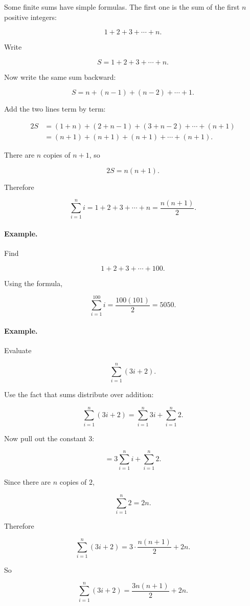 Some finite sums have simple formulas.  The first one is the sum of the first \(n\)
positive integers:

\[
1+2+3+\cdots+n.
\]

Write

\[
S=1+2+3+\cdots+n.
\]

Now write the same sum backward:

\[
S=n+(n-1)+(n-2)+\cdots+1.
\]

Add the two lines term by term:

\[
\begin{aligned}
2S
&=
(1+n)+(2+n-1)+(3+n-2)+\cdots+(n+1)\\
&=
(n+1)+(n+1)+(n+1)+\cdots+(n+1).
\end{aligned}
\]

There are \(n\) copies of \(n+1\), so

\[
2S=n(n+1).
\]

Therefore

\[
\boxed{
\sum_{i=1}^{n} i
=
1+2+3+\cdots+n
=
\frac{n(n+1)}{2}.
}
\]

\paragraph{Example.}
Find

\[
1+2+3+\cdots+100.
\]

Using the formula,

\[
\sum_{i=1}^{100} i
=
\frac{100(101)}{2}
=
5050.
\]

\paragraph{Example.}
Evaluate

\[
\sum_{i=1}^{n}(3i+2).
\]

Use the fact that sums distribute over addition:

\[
\sum_{i=1}^{n}(3i+2)
=
\sum_{i=1}^{n}3i+\sum_{i=1}^{n}2.
\]

Now pull out the constant \(3\):

\[
=
3\sum_{i=1}^{n}i+\sum_{i=1}^{n}2.
\]

Since there are \(n\) copies of \(2\),

\[
\sum_{i=1}^{n}2=2n.
\]

Therefore

\[
\sum_{i=1}^{n}(3i+2)
=
3\cdot \frac{n(n+1)}{2}+2n.
\]

So

\[
\boxed{
\sum_{i=1}^{n}(3i+2)
=
\frac{3n(n+1)}{2}+2n.
}
\]

